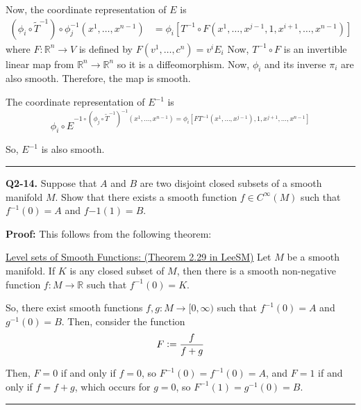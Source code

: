\documentclass{article}
\newcommand{\R}{\mathbb{R}}
\newcommand{\defeq}{\vcentcolon=}
\begin{document}
Now, the coordinate representation of $E$ is 
\begin{align*}
  \left( \phi_i \circ \tilde{T}^{-1} \right) \circ \phi_j^{-1}(x^1, \dots, x^{n-1}) &= \phi_i \left[T^{-1} \circ F\left( x^1, \dots, x^{j-1}, 1, x^{i+1}, \dots, x^{n-1} \right) \right]
\end{align*}
where $F : \R^n \rightarrow V$ is defined by $F(v^1, \dots, c^{n}) = v^i E_i$ Now, $T^{-1} \circ F$ is an invertible linear map from $\R^n \rightarrow \R^n$ so it is a diffeomorphism. Now, $\phi_i$ and its inverse $\pi_i$ are also smooth. Therefore, the map is smooth.

The coordinate representation of $E^{-1}$ is 
\[ \phi_i \circ E^{-1 \circ \left( \phi_j \circ \tilde{T}^{-1} \right) ^{-1}(x^1, \dots, x^{n-1}) = \phi_i \left[ F T^{-1}(x^1, \dots, x^{j-1}), 1, x^{j+1}, \dots, x^{n-1}\right] }  \]

So, $E^{-1}$ is also smooth.

\vskip 0.5cm
\hrule 
\vskip 0.5cm


\textbf{Q2-14.} Suppose that $A$ and $B$ are two disjoint closed subsets of a smooth manifold $M$. Show that there exists a smooth function $f \in C^{\infty}(M)$ such that $f^{-1}(0) = A$ and $f{-1}(1) = B$.

\vskip 0.5cm
\textbf{Proof:}
This follows from the following theorem:

\begin{dottedbox}
  \underline{Level sets of Smooth Functions: (Theorem 2.29 in LeeSM)}
  Let $M$ be a smooth manifold. If $K$ is any closed subset of $M$, then there is a smooth non-negative function $f : M \rightarrow \R$ such that $f^{-1}(0) = K$.
\end{dottedbox}

So, there exist smooth functions $f, g : M \rightarrow [0, \infty)$ such that $f^{-1}(0) = A$ and $g^{-1}(0) = B$. Then, consider the function 
\[ F \defeq \frac{f}{f+g} \]

Then, $F = 0$ if and only if $f = 0$, so $F^{-1}(0) = f^{-1}(0) = A$, and $F = 1$ if and only if $f = f + g$, which occurs for $g = 0$, so $F^{-1}(1) = g^{-1}(0) = B$.

\vskip 0.5cm
\hrule 
\vskip 0.5cm











\end{document}

